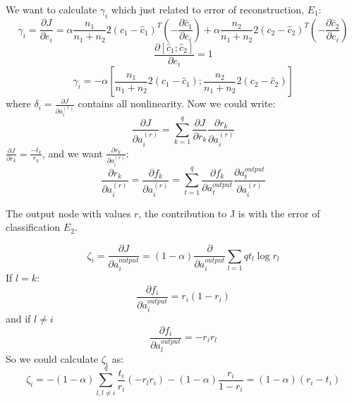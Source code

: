 \documentclass[twoside,12pt]{article}
\begin{document}
We want to calculate $\gamma_i$ which just related to error of reconstruction, $E_1$:
\begin{equation}
\gamma_i=\frac{\partial J}{\partial e_i} = \alpha\frac{n_1}{n_1+n_2}2(c_1-\hat{c}_1)^T(-\frac{\partial \hat{c}_1}{\partial e_i})+\alpha\frac{n_2}{n_1+n_2}2(c_2-\hat{c}_2)^T(-\frac{\partial \hat{c}_2}{\partial e_i})
\end{equation}
\begin{equation}
\frac{\partial [\hat{c}_1;\hat{c}_2]}{\partial e_i}=1
\end{equation}
\begin{equation}
\gamma_i=-\alpha[\frac{n_1}{n_1+n_2}2(c_1-\hat{c}_1);\frac{n_2}{n_1+n_2}2(c_2-\hat{c}_2)]
\end{equation}
where $\delta_i=\frac{\partial J}{\partial a^{(r)}_i}$ contains all nonlinearity. Now we could write:
\begin{equation}
\frac{\partial J}{\partial a^{(r)}_i}= \sum_{k=1}^q\frac{\partial J}{\partial r_k}\frac{\partial r_k}{\partial a^{(r)}_i}
\end{equation}
$\frac{\partial J}{\partial r_k}=\frac{-t_k}{r_k}$, and we want $\frac{\partial r_k}{\partial a^{(r)}_i}$:
\begin{equation}
\frac{\partial r_k}{\partial a^{(r)}_i}=\frac{\partial f_k}{\partial a^{(r)}_i}=\sum_{t=1}^{q}\frac{\partial f_k}{\partial a^{output}_{t}}\frac{\partial a^{output}_t}{\partial a^{(r)}_i}
\end{equation}

The output node with values $r$, the contribution to J is with the error of classification $E_2$.

\begin{equation}
\zeta_i=\frac{\partial J}{\partial a^{output}_i}=(1-\alpha)\frac{\partial }{\partial a^{output}_i}\sum_{l=1}{q}t_l\log{r_l}
\end{equation}
If $l=k$:
\begin{equation}
\frac{\partial f_i}{\partial a^{output}_{i}}=r_i(1-r_i)
\end{equation}
and if $l\neq i$
\begin{equation}
\frac{\partial f_i}{\partial a^{output}_{l}}=-r_ir_l
\end{equation}
So we could calculate $\zeta_i$ as:
\begin{equation}
\zeta_i = -(1-\alpha)\sum_{l,l\neq i}^q\frac{t_i}{r_i}(-r_lr_i)-(1-\alpha)\frac{r_i}{1-r_i}=(1-\alpha)(r_i-t_i)
\end{equation}
\end{document}
